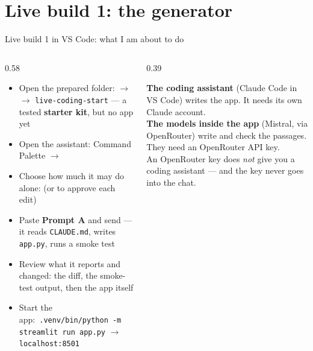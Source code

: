 \section[Build 1: generator]{Live build 1: the generator}

\begin{frame}{Live build 1 in VS Code: what I am about to do}
  \begin{columns}[T,onlytextwidth]
    \begin{column}{0.58\textwidth}
      \footnotesize
      \begin{itemize}\setlength{\itemsep}{3.5pt}
        \item[\step{1}] Open the prepared folder:  $\rightarrow$  $\rightarrow$
              \texttt{live-coding-start} --- a tested \textbf{starter kit}, but no app yet
        \item[\step{2}] Open the assistant: Command Palette $\rightarrow$ 
        \item[\step{3}] Choose how much it may do alone:  (or  to approve each edit)
        \item[\step{4}] Paste \textbf{Prompt A} and send --- it reads \texttt{CLAUDE.md}, writes \texttt{app.py}, runs a smoke test
        \item[\step{5}] Review what it reports and changed: the diff, the smoke-test output, then the app itself
        \item[\step{6}] Start the app:\ \texttt{.venv/bin/python -m streamlit run app.py} $\rightarrow$ \texttt{localhost:8501}
      \end{itemize}
    \end{column}
    \begin{column}{0.39\textwidth}
      \begin{mistake}
        \textbf{The coding assistant} (Claude Code in VS Code) writes the app. It needs its own Claude account.\\[1mm]
        \textbf{The models inside the app} (Mistral, via OpenRouter) write and check the passages. They need an
        OpenRouter API key.\\[1mm]
        An OpenRouter key does \emph{not} give you a coding assistant --- and the key never goes into the chat.
      \end{mistake}
    \end{column}
  \end{columns}

\end{frame}
